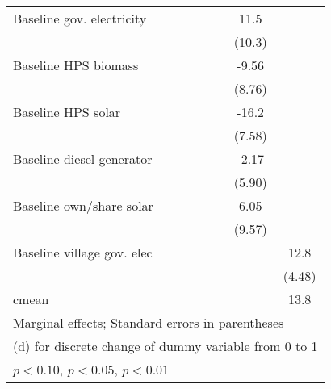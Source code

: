 \begin{table}[htbp]
\begin{tabular*}{1\hsize}{@{\hskip\tabcolsep\extracolsep\fill}l*{6}{c}}
Baseline gov. electricity&                  &                  &                  &                  &     11.5         &                  \\
                &                  &                  &                  &                  &   (10.3)         &                  \\
Baseline HPS biomass&                  &                  &                  &                  &    -9.56         &                  \\
                &                  &                  &                  &                  &   (8.76)         &                  \\
Baseline HPS solar&                  &                  &                  &                  &    -16.2\sym{**} &                  \\
                &                  &                  &                  &                  &   (7.58)         &                  \\
Baseline diesel generator&                  &                  &                  &                  &    -2.17         &                  \\
                &                  &                  &                  &                  &   (5.90)         &                  \\
Baseline own/share solar&                  &                  &                  &                  &     6.05         &                  \\
                &                  &                  &                  &                  &   (9.57)         &                  \\
Baseline village gov. elec&                  &                  &                  &                  &                  &     12.8\sym{***}\\
                &                  &                  &                  &                  &                  &   (4.48)         \\
\midrule
cmean           &                  &                  &                  &                  &                  &     13.8         \\
\bottomrule
\multicolumn{7}{l}{\footnotesize Marginal effects; Standard errors in parentheses}\\
\multicolumn{7}{l}{\footnotesize  (d) for discrete change of dummy variable from 0 to 1}\\
\multicolumn{7}{l}{\footnotesize \sym{*} \(p<0.10\), \sym{**} \(p<0.05\), \sym{***} \(p<0.01\)}\\
\end{tabular*}
\end{table}
